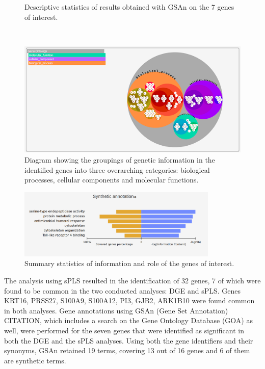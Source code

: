 \documentclass[journal, a4paper]{IEEEtran}
\begin{document}
\begin{figure}[!htp]
\begin{center}
\begin{minipage}{0.5 \textwidth}
      \caption{Descriptive statistics of results obtained with GSAn on the 7 genes of interest.}
      \label{fig:gsan-chart}
    \end{minipage}\\
    \begin{minipage}{0.5 \textwidth}
      \centering
      \includegraphics[width=\textwidth]{gene-ontology.png}
      \caption{Diagram showing the groupings of genetic information in the identified genes into three overarching categories: biological processes, cellular components and molecular functions.}
      \label{fig:gene-ontology}
    \end{minipage}
  \end{center}
\end{figure}

\begin{figure} %
  \centering
  \includegraphics[width=0.85\textwidth]{synthetic-annotation.png}
  \caption{Summary statistics of information and role of the genes of interest.}
  \label{fig:synthetic-annotation}
\end{figure}


The analysis using sPLS resulted in the identification of 32 genes, 7 of which were found to be common in the two conducted analyses: DGE and sPLS. Genes KRT16, PRSS27, S100A9, S100A12, PI3, GJB2, ARK1B10 were found common in both analyses. Gene annotations using GSAn (Gene Set Annotation) CITATION, which includes a search on the Gene Ontology Database (GOA) as well, were performed for the seven genes that were identified as significant in both the DGE and the sPLS analyses. Using both the gene identifiers and their synonyms, GSAn retained 19 terms, covering 13 out of 16 genes and 6 of them are synthetic terms.\\
\end{document}
